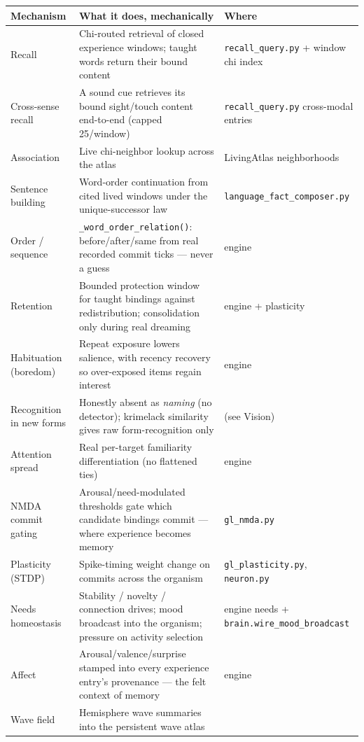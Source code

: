 \documentclass[11pt]{article}
\begin{document}
\begin{longtable}{p{} p{} p{}}
\toprule
\textbf{Mechanism} & \textbf{What it does, mechanically} & \textbf{Where} \\
\midrule
Recall & Chi-routed retrieval of closed experience windows; taught words
return their bound content & \texttt{recall\_query.py} + window chi index \\
Cross-sense recall & A sound cue retrieves its bound sight/touch content
end-to-end (capped 25/window) & \texttt{recall\_query.py} cross-modal
entries \\
Association & Live chi-neighbor lookup across the atlas &
LivingAtlas neighborhoods \\
Sentence building & Word-order continuation from cited lived windows under
the unique-successor law & \texttt{language\_fact\_composer.py} \\
Order / sequence & \texttt{\_word\_order\_relation()}: before/after/same
from real recorded commit ticks — never a guess & engine \\
Retention & Bounded protection window for taught bindings against
redistribution; consolidation only during real dreaming & engine +
plasticity \\
Habituation (boredom) & Repeat exposure lowers salience, with recency
recovery so over-exposed items regain interest & engine \\
Recognition in new forms & Honestly absent as \emph{naming} (no detector);
krimelack similarity gives raw form-recognition only & (see Vision) \\
Attention spread & Real per-target familiarity differentiation (no
flattened ties) & engine \\
NMDA commit gating & Arousal/need-modulated thresholds gate which candidate
bindings commit — where experience becomes memory & \texttt{gl\_nmda.py} \\
Plasticity (STDP) & Spike-timing weight change on commits across the
organism & \texttt{gl\_plasticity.py}, \texttt{neuron.py} \\
Needs homeostasis & Stability / novelty / connection drives; mood broadcast
into the organism; pressure on activity selection & engine needs +
\texttt{brain.wire\_mood\_broadcast} \\
Affect & Arousal/valence/surprise stamped into every experience entry's
provenance — the felt context of memory & engine \\
Wave field & Hemisphere wave summaries into the persistent wave atlas &

\end{longtable}
\end{document}
